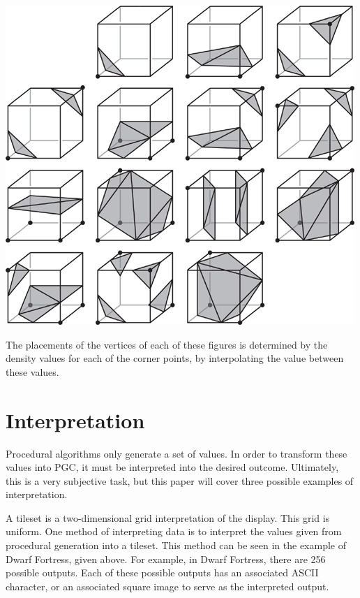 \documentclass[10pt]{report}
\begin{document}
		\begin{minipage}{\textwidth}
			\centering
			\includegraphics[scale=0.75]{01fig04}
			\label{fig:01fig04}
		\end{minipage}
	
		The placements of the vertices of each of these figures is determined by the density values for each of the corner points, by interpolating the value between these values.
		
	\vspace{10pt}
	\let\clearpage\relax
	\chapter{Interpretation} \label{chap:interpret}
		
		Procedural algorithms only generate a set of values. In order to transform these values into PGC, it must be interpreted into the desired outcome. Ultimately, this is a very subjective task, but this paper will cover three possible examples of interpretation. 
		
		A tileset is a two-dimensional grid interpretation of the display. This grid is uniform. One method of interpreting data is to interpret the values given from procedural generation into a tileset. This method can be seen in the example of Dwarf Fortress, given above. For example, in Dwarf Fortress, there are 256 possible outputs. Each of these possible outputs has an associated ASCII character, or an associated square image to serve as the interpreted output. 
		
\end{document}
